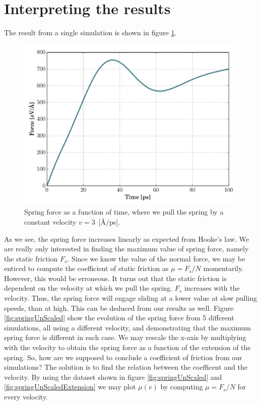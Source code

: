 \documentclass[twoside,english]{uiofysmaster}
\begin{document}
\section{Interpreting the results}
The result from a single simulation is shown in figure \ref{fig:springSingle_v3}.
\begin{figure}
	\centering
	\includegraphics[width=0.7\linewidth]{figures/friction/scalingCoeffisient/single_v3}
	\caption{Spring force as a function of time, where we pull the spring by a constant velocity $v=3$~[\AA/ps].}
	\label{fig:springSingle_v3}
\end{figure}
\noindent
As we see, the spring force increases linearly as expected from Hooke's law. 
We are really only interested in finding the maximum value of spring force, namely the static friction $F_s$.
Since we know the value of the normal force, we may be enticed to compute the coefficient of static friction as $\mu=F_ s/N$ momentarily. 
However, this would be erroneous. 
It turns out that the static friction is dependent on the velocity at which we pull the spring. 
$F_s$ increases with the velocity.
Thus, the spring force will engage sliding at a lower value at slow pulling speeds, than at high.
This can be deduced from our results as well. 
Figure \ref{fig:springUnScaled} show the evolution of the spring force from 5 different simulations, all using a different velocity, and demonstrating that the maximum spring force is different in each case. 
We may rescale the x-axis by multiplying with the velocity to obtain the spring force as a function of the extension of the spring.  
So, how are we supposed to conclude a coefficient of friction from our simulations? 
The solution is to find the relation between the coefficent and the velocity.
By using the dataset shown in figure \ref{fig:springUnScaled} and \ref{fig:springUnScaledExtension} we may plot $\mu(v)$ by computing $\mu = F_s/N$ for every velocity.
\end{document}
